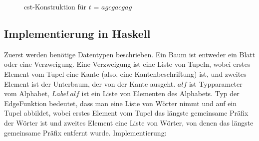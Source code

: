 \documentclass[12pt]{report}
\begin{document}
\begin{figure}[h]
\medskip
\caption{cst-Konstruktion für $t$ = $agcgacgag$}
\label{fig:cstKonstruktion}
\end{figure}

\subsection{Implementierung in Haskell}
\label{sec:ImplementierungInHaskell}

Zuerst werden benötige Datentypen beschrieben. Ein Baum ist entweder ein Blatt oder eine Verzweigung. Eine Verzweigung ist eine Liste von Tupeln, wobei erstes Element vom Tupel eine Kante (also, eine Kantenbeschriftung) ist, und zweites Element ist der Unterbaum, der von der Kante ausgeht. $alf$ ist Typparameter vom Alphabet, $Label\:alf$ ist ein Liste von Elementen des Alphabets.
Typ der EdgeFunktion bedeutet, dass man eine Liste von Wörter nimmt und auf ein Tupel abbildet, wobei erstes Element vom Tupel das längste gemeinsame Präfix der Wörter ist und zweites Element eine Liste von Wörter, von denen das längste gemeinsame Präfix entfernt wurde. Implementierung:
\end{document}
